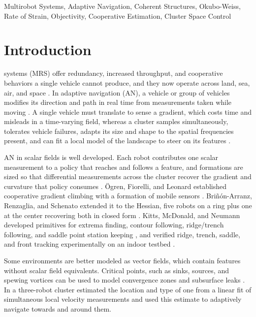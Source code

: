 \documentclass[lettersize,journal]{IEEEtran}
\begin{document}
\begin{IEEEkeywords}
Multirobot Systems, Adaptive Navigation, Coherent Structures,
Okubo-Weiss, Rate of Strain, Objectivity, Cooperative
Estimation, Cluster Space Control
\end{IEEEkeywords}

\section{Introduction}

 systems (MRS) offer redundancy, increased
throughput, and cooperative behaviors a single vehicle cannot produce,
and they now operate across land, sea, air, and space \cite{1}.
 In adaptive
navigation (AN), a vehicle or group of vehicles modifies its direction and path in real time
from measurements taken while moving \cite{2}. A single vehicle must translate to sense a
gradient, which costs time and misleads in a time-varying field,
whereas a cluster samples simultaneously, tolerates vehicle failures,
adapts its size and shape to the spatial frequencies present, and can
fit a local model of the landscape to steer on its features
\cite{2,3,4}.

AN in scalar fields is well developed. Each
robot contributes one scalar measurement to a policy that reaches and
follows a feature, and formations are sized so that differential
measurements across the cluster recover the gradient and curvature that
policy consumes \cite{4,5}. \"{O}gren, Fiorelli, and Leonard
established cooperative gradient climbing with a formation of mobile
sensors \cite{5}. Bri\~{n}\'{o}n-Arranz, Renzaglia, and Schenato
extended it to the Hessian, five robots on a ring plus one at the
center recovering both in closed form \cite{4}. Kitts, McDonald, and
Neumann developed primitives for extrema finding, contour following,
ridge/trench following, and saddle point station keeping \cite{2}, and
verified ridge, trench, saddle, and front tracking experimentally on an
indoor testbed \cite{3,6}.

Some environments are better modeled as vector fields, which contain features without scalar field equivalents. Critical points, such as sinks, sources, and spewing vortices can be used to model convergence zones and
subsurface leaks \cite{7}.  In \cite{8} a three-robot cluster
estimated the location and type of one from a linear fit of
simultaneous local velocity measurements and used this estimate to adaptively navigate towards and around them. 
\end{document}
